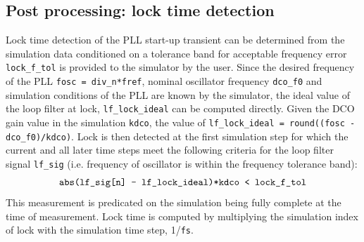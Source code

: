 \subsection{Post processing: lock time detection}
Lock time detection of the PLL start-up transient can be determined from the simulation data conditioned on a tolerance band for acceptable frequency error \texttt{lock\_f\_tol} is provided to the simulator by the user. Since the desired frequency of the PLL \texttt{fosc = div\_n*fref}, nominal oscillator frequency \texttt{dco\_f0} and simulation conditions of the PLL are known by the simulator, the ideal value of the loop filter at lock, \texttt{lf\_lock\_ideal} can be computed directly. Given the DCO gain value in the simulation \texttt{kdco}, the value of \texttt{lf\_lock\_ideal = round((fosc - dco\_f0)/kdco)}. Lock is then detected at the first simulation step for which the current and all later time steps meet the following criteria for the loop filter signal \texttt{lf\_sig} (i.e. frequency of oscillator is within the frequency tolerance band):
\begin{equation}
\text{\texttt{abs(lf\_sig[n] - lf\_lock\_ideal)*kdco < lock\_f\_tol}}
\end{equation}
This measurement is predicated on the simulation being fully complete at the time of measurement. Lock time is computed by multiplying the simulation index of lock with the simulation time step, 1/\texttt{fs}.

